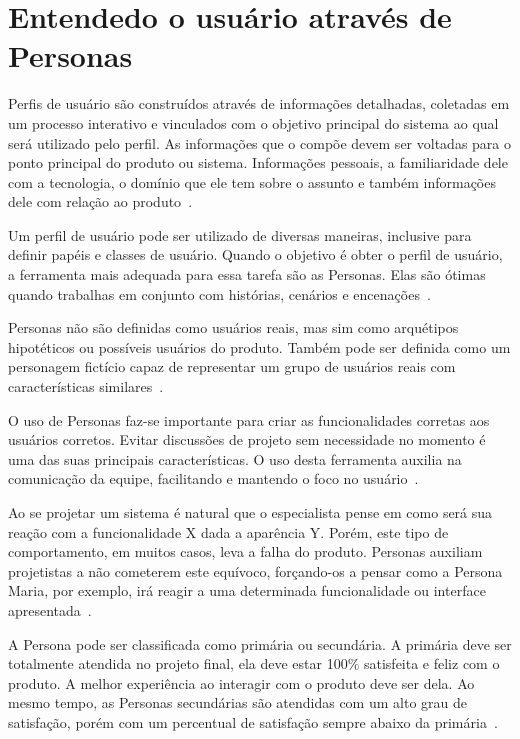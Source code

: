 \section{Entendedo o usuário através de Personas}
\label{sec:personas}

Perfis de usuário são construídos através de informações detalhadas, coletadas em um processo interativo e vinculados com o objetivo principal do sistema ao qual será utilizado pelo perfil. As informações que o compõe devem ser voltadas para o ponto principal do produto ou sistema. Informações pessoais, a familiaridade dele com a tecnologia, o domínio que ele tem sobre o assunto e também informações dele com relação ao produto~\cite{barbosa:2010}.

Um perfil de usuário pode ser utilizado de diversas maneiras, inclusive para definir papéis e classes de usuário. Quando o objetivo é obter o perfil de usuário, a ferramenta mais adequada para essa tarefa são as Personas. Elas são ótimas quando trabalhas em conjunto com histórias, cenários e encenações~\cite{hartson:2012}.

Personas não são definidas como usuários reais, mas sim como arquétipos hipotéticos ou possíveis usuários do produto. Também pode ser definida como um personagem fictício capaz de representar um grupo de usuários reais com características similares~\cite{aquino:2005, barbosa:2010, hartson:2012, masiero:2013}.

O uso de Personas faz-se importante para criar as funcionalidades corretas aos usuários corretos. Evitar discussões de projeto sem necessidade no momento é uma das suas principais características. O uso desta ferramenta auxilia na comunicação da equipe, facilitando e mantendo o foco no usuário~\cite{aquino:2005, hartson:2012, masiero:2013}.

Ao se projetar um sistema é natural que o especialista pense em como será sua reação com a funcionalidade X dada a aparência Y. Porém, este tipo de comportamento, em muitos casos, leva a falha do produto. Personas auxiliam projetistas a não cometerem este equívoco, forçando-os a pensar como a Persona Maria, por exemplo, irá reagir a uma determinada funcionalidade ou interface apresentada~\cite{hartson:2012}.

A Persona pode ser classificada como primária ou secundária. A primária deve ser totalmente atendida no projeto final, ela deve estar 100\% satisfeita e feliz com o produto. A melhor experiência ao interagir com o produto deve ser dela. Ao mesmo tempo, as Personas secundárias são atendidas com um alto grau de satisfação, porém com um percentual de satisfação sempre abaixo da primária~\cite{hartson:2012}.

